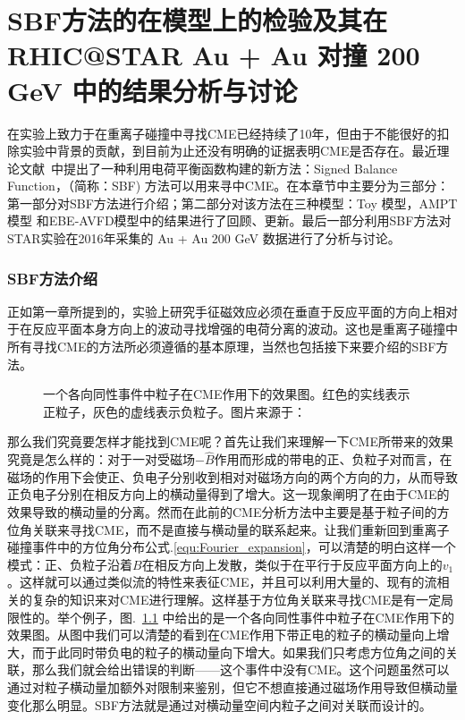 
\setcounter{section}{0}

\setcounter{figure}{0}
\setcounter{table}{0}
\setcounter{equation}{0}

\chapter[SBF方法寻找CME]{SBF方法的在模型上的检验及其在RHIC@STAR Au + Au 对撞 200 GeV 中的结果分析与讨论}


在实验上致力于在重离子碰撞中寻找CME已经持续了10年，但由于不能很好的扣除实验中背景的贡献，到目前为止还没有明确的证据表明CME是否存在。最近理论文献~\cite{Tang2019}中提出了一种利用电荷平衡函数构建的新方法：Signed Balance Function，（简称：SBF) 方法可以用来寻中CME。在本章节中主要分为三部分：第一部分对SBF方法进行介绍；第二部分对该方法在三种模型：Toy 模型，AMPT 模型 和EBE-AVFD模型中的结果进行了回顾、更新。最后一部分利用SBF方法对STAR实验在2016年采集的 Au + Au 200 GeV 数据进行了分析与讨论。

\bigskip

\subsection{SBF方法介绍}
正如第一章所提到的，实验上研究手征磁效应必须在垂直于反应平面的方向上相对于在反应平面本身方向上的波动寻找增强的电荷分离的波动。这也是重离子碰撞中所有寻找CME的方法所必须遵循的基本原理，当然也包括接下来要介绍的SBF方法。

\begin{figure}[htbp]
\centering
{}
\caption{一个各向同性事件中粒子在CME作用下的效果图。红色的实线表示正粒子，灰色的虚线表示负粒子。图片来源于：~\citep{Tang2019}}
\label{fig:Aihong_KatongChargeSeparation}
\end{figure}

那么我们究竟要怎样才能找到CME呢？首先让我们来理解一下CME所带来的效果究竟是怎么样的：对于一对受磁场$-\hat{B}$作用而形成的带电的正、负粒子对而言，在磁场的作用下会使正、负电子分别收到相对对磁场方向的两个方向的力，从而导致正负电子分别在相反方向上的横动量得到了增大。这一现象阐明了在由于CME的效果导致的横动量的分离。然而在此前的CME分析方法中主要是基于粒子间的方位角关联来寻找CME，而不是直接与横动量的联系起来。让我们重新回到重离子碰撞事件中的方位角分布公式.\ref {equ:Fourier_expansion}，可以清楚的明白这样一个模式：正、负粒子沿着$B$在相反方向上发散，类似于在平行于反应平面方向上的$v_1$。这样就可以通过类似流的特性来表征CME，并且可以利用大量的、现有的流相关的复杂的知识来对CME进行理解。这样基于方位角关联来寻找CME是有一定局限性的。举个例子，图.~\ref{fig:Aihong_KatongChargeSeparation} 中给出的是一个各向同性事件中粒子在CME作用下的效果图。从图中我们可以清楚的看到在CME作用下带正电的粒子的横动量向上增大，而于此同时带负电的粒子的横动量向下增大。如果我们只考虑方位角之间的关联，那么我们就会给出错误的判断——这个事件中没有CME。这个问题虽然可以通过对粒子横动量加额外对限制来鉴别，但它不想直接通过磁场作用导致但横动量变化那么明显。SBF方法就是通过对横动量空间内粒子之间对关联而设计的。


